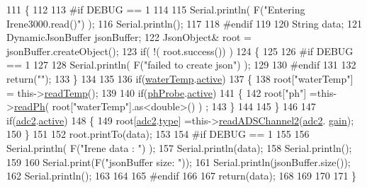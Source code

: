 \begin{DoxyCode}
111 \{
112 
113 \textcolor{preprocessor}{#if DEBUG == 1 }
114     
115     Serial.println( F(\textcolor{stringliteral}{"Entering Irene3000.read()"}) );
116     Serial.println();
117 
118 \textcolor{preprocessor}{#endif }
119 
120     String data;
121     DynamicJsonBuffer jsonBuffer;
122     JsonObject& root = jsonBuffer.createObject();
123     \textcolor{keywordflow}{if}( !( root.success()) )
124     \{
125     
126 \textcolor{preprocessor}{    #if DEBUG == 1 }
127 
128         Serial.println( F(\textcolor{stringliteral}{"failed to create json"}) );
129     
130 \textcolor{preprocessor}{    #endif }
131 
132         \textcolor{keywordflow}{return}(\textcolor{stringliteral}{""});
133     \}
134 
135         
136     \textcolor{keywordflow}{if}(\hyperlink{class_irene3000_af05612c78c758ce9db316c75ad937130}{waterTemp}.\hyperlink{struct_irene3000_1_1state_a879828ace7e7a7bc91ff703bfee36599}{active})
137     \{
138         root[\textcolor{stringliteral}{"waterTemp"}] = this->\hyperlink{class_irene3000_a80bc6dfea106dc3bc54fa20204d4d5dc}{readTemp}();
139 
140         \textcolor{keywordflow}{if}(\hyperlink{class_irene3000_a997a4ee466fa1d5416e07e444965dc9e}{phProbe}.\hyperlink{struct_irene3000_1_1state_a879828ace7e7a7bc91ff703bfee36599}{active})
141         \{
142             root[\textcolor{stringliteral}{"ph"}] =this->\hyperlink{class_irene3000_a436fc0a06681cd0784aba56b9707f19a}{readPh}( root[\textcolor{stringliteral}{"waterTemp"}].as<double>() ) ;
143         \}
144 
145     \}
146 
147     \textcolor{keywordflow}{if}(\hyperlink{class_irene3000_aae3a95a1c83c766cd2f299ce471c337e}{adc2}.\hyperlink{struct_irene3000_1_1state_a879828ace7e7a7bc91ff703bfee36599}{active})
148     \{
149         root[\hyperlink{class_irene3000_aae3a95a1c83c766cd2f299ce471c337e}{adc2}.\hyperlink{struct_irene3000_1_1state_a9897a7e02727db6351d44006eec73799}{type}] =this->\hyperlink{class_irene3000_ae73bd2ed14a199a7e83f4d6458476a7c}{readADSChannel2}(\hyperlink{class_irene3000_aae3a95a1c83c766cd2f299ce471c337e}{adc2}.
      \hyperlink{struct_irene3000_1_1state_a1ecf69d38cb31ecaf6b3602a3f3e93cb}{gain});
150     \}
151     
152     root.printTo(data);
153     
154 \textcolor{preprocessor}{#if DEBUG == 1 }
155 
156     Serial.println( F(\textcolor{stringliteral}{"Irene data : "}) );
157     Serial.println(data);
158     Serial.println();
159 
160     Serial.print(F(\textcolor{stringliteral}{"jsonBuffer size: "}));
161     Serial.println(jsonBuffer.size());
162     Serial.println();
163 
164 
165 \textcolor{preprocessor}{#endif}
166     
167     \textcolor{keywordflow}{return}(data);
168     
169     
170 
171 \}
\end{DoxyCode}
